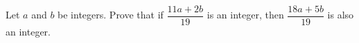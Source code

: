 Let $a$ and $b$ be integers. Prove that if $\dfrac{11a+2b}{19}$ is an integer, then $\dfrac{18a+5b}{19}$ is also an integer.
